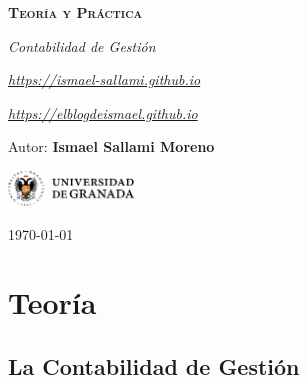 \documentclass[12pt]{report} %
\begin{document}
\begin{titlepage}
    \begin{center}
        \vspace*{2cm}
        
        {\Huge \bfseries\scshape Teoría y Práctica \par}
        \vspace{0.5cm}
        {\Large \itshape Contabilidad de Gestión \par}
        \vspace{0.5cm}
        {\small \itshape \href{https://ismael-sallami.github.io}{https://ismael-sallami.github.io} \par}
        {\small \itshape \href{https://elblogdeismael.github.io}{https://elblogdeismael.github.io} \par}


        \vfill
        
        {\LARGE Autor: \textbf{Ismael Sallami Moreno} \par}
        \vspace{0.3cm}
        
        \vspace{1cm}
        \includegraphics[width=0.25\textwidth]{../../../extraFiles/img/ugr.png} %
        \vspace{1cm}
        
        {\large \today}
    \end{center}
    
    \restoregeometry
\end{titlepage}


\thispagestyle{empty} %
\clearpage

\tableofcontents
\listoffigures
\clearpage

\listoftables
\clearpage
\thispagestyle{empty} %
\clearpage

\part{Teoría}

\hypertarget{la-contabilidad-de-gestiuxf3n}{%
\chapter{La Contabilidad de
Gestión}\label{la-contabilidad-de-gestiuxf3n}}
\end{document}
